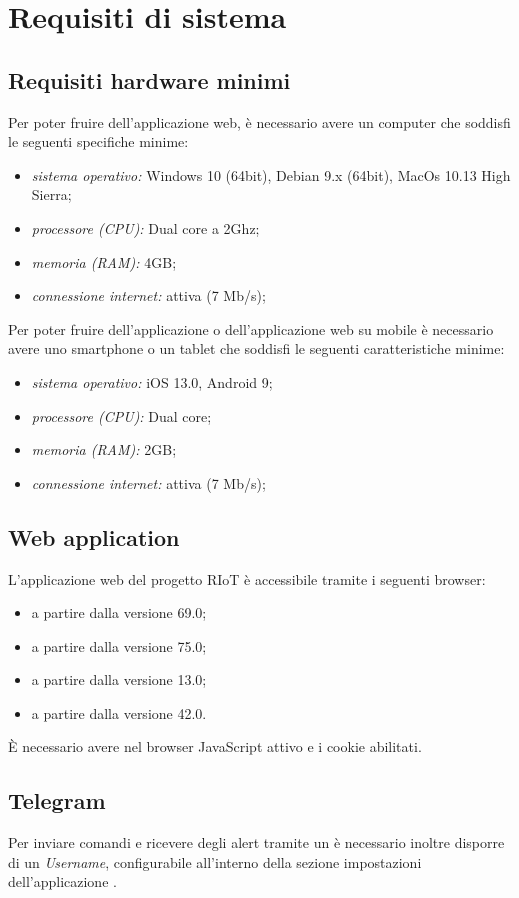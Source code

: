 \section{Requisiti di sistema}

	\subsection{Requisiti hardware minimi}
	Per poter fruire dell'applicazione web, è necessario avere un computer che soddisfi le seguenti specifiche minime:
	\begin{itemize}
	 	\item \textit{sistema operativo:} Windows 10 (64bit), Debian 9.x (64bit), MacOs 10.13 High Sierra;
	 	\item \textit{processore (CPU):} Dual core a 2Ghz;
	 	\item \textit{memoria (RAM):} 4GB;
	 	\item \textit{connessione internet:} attiva (7 Mb/s); %
	\end{itemize} 
	Per poter fruire dell'applicazione  o dell'applicazione web su mobile è necessario avere uno smartphone o un tablet che soddisfi le seguenti caratteristiche minime:
	\begin{itemize}
	 	\item \textit{sistema operativo:} iOS 13.0, Android 9;
	 	\item \textit{processore (CPU):} Dual core;
	 	\item \textit{memoria (RAM):} 2GB;
	 	\item \textit{connessione internet:} attiva (7 Mb/s); %
	\end{itemize} 

	\subsection{Web application}
	L'applicazione web del progetto RIoT è accessibile tramite i seguenti browser:
	\begin{itemize}
	 	\item {} a partire dalla versione 69.0;
	 	\item {} a partire dalla versione 75.0;
	 	\item {} a partire dalla versione 13.0;
	 	\item {} a partire dalla versione 42.0.
	\end{itemize} 
	È necessario avere nel browser JavaScript attivo e i cookie abilitati.

	\subsection{Telegram}
	Per inviare comandi e ricevere degli alert tramite un  è necessario inoltre disporre di un \textit{Username}, configurabile all'interno della sezione impostazioni dell'applicazione .
